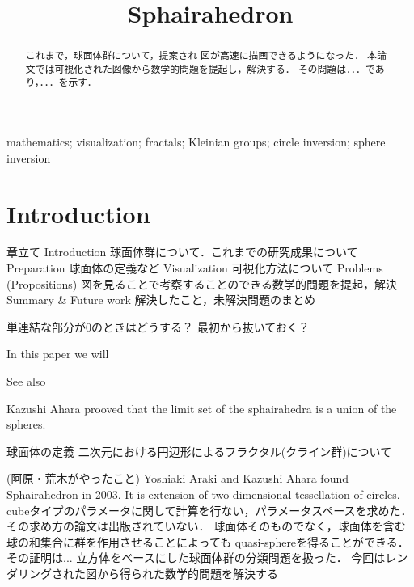 \documentclass[dvipdfmx]{interact}
\theoremstyle{plain}%
\theoremstyle{definition}
\theoremstyle{remark}
\begin{document}

\title{Sphairahedron}

\author{
}

\maketitle

\begin{abstract}
 これまで，球面体群について，提案され
 図が高速に描画できるようになった．
 本論文では可視化された図像から数学的問題を提起し，解決する．
 その問題は．．．であり，．．．を示す．
\end{abstract}

\begin{keywords}
mathematics; visualization; fractals; Kleinian groups; circle inversion;
 sphere inversion
\end{keywords}

\section{Introduction}

章立て
Introduction 球面体群について．これまでの研究成果について
Preparation 球面体の定義など
Visualization 可視化方法について
Problems (Propositions) 図を見ることで考察することのできる数学的問題を提起，解決
Summary \& Future work 解決したこと，未解決問題のまとめ

単連結な部分が0のときはどうする？ 最初から抜いておく？

In this paper we will

See also \cite{bridges2018}

Kazushi Ahara prooved that the limit set of the sphairahedra
is a union of the spheres.

球面体の定義
二次元における円辺形によるフラクタル(クライン群)について

(阿原・荒木がやったこと)
Yoshiaki Araki and Kazushi Ahara found Sphairahedron in 2003.
It is extension of two dimensional tessellation of circles.
cubeタイプのパラメータに関して計算を行ない，パラメータスペースを求めた．
その求め方の論文は出版されていない．
球面体そのものでなく，球面体を含む球の和集合に群を作用させることによっても
quasi-sphereを得ることができる．その証明は...
立方体をベースにした球面体群の分類問題を扱った．
今回はレンダリングされた図から得られた数学的問題を解決する
\end{document}
